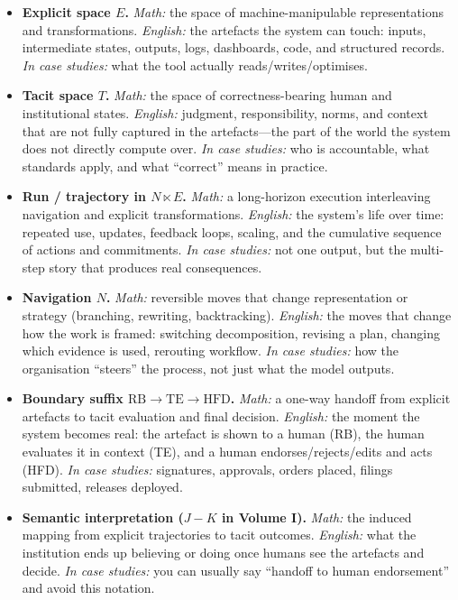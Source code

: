 \begin{itemize}
  \item \textbf{Explicit space $E$.}
        \emph{Math:} the space of machine-manipulable representations and transformations.
        \emph{English:} the artefacts the system can touch: inputs, intermediate states, outputs, logs,
        dashboards, code, and structured records.
        \emph{In case studies:} what the tool actually reads/writes/optimises.

  \item \textbf{Tacit space $T$.}
        \emph{Math:} the space of correctness-bearing human and institutional states.
        \emph{English:} judgment, responsibility, norms, and context that are not fully captured in the
        artefacts---the part of the world the system does not directly compute over.
        \emph{In case studies:} who is accountable, what standards apply, and what ``correct'' means in practice.

  \item \textbf{Run / trajectory in $N \ltimes E$.}
        \emph{Math:} a long-horizon execution interleaving navigation and explicit transformations.
        \emph{English:} the system’s life over time: repeated use, updates, feedback loops, scaling, and
        the cumulative sequence of actions and commitments.
        \emph{In case studies:} not one output, but the multi-step story that produces real consequences.

  \item \textbf{Navigation $N$.}
        \emph{Math:} reversible moves that change representation or strategy (branching, rewriting, backtracking).
        \emph{English:} the moves that change how the work is framed: switching decomposition, revising a plan,
        changing which evidence is used, rerouting workflow.
        \emph{In case studies:} how the organisation ``steers'' the process, not just what the model outputs.

  \item \textbf{Boundary suffix $\mathrm{RB}\to\mathrm{TE}\to\mathrm{HFD}$.}
        \emph{Math:} a one-way handoff from explicit artefacts to tacit evaluation and final decision.
        \emph{English:} the moment the system becomes real: the artefact is shown to a human (RB), the human
        evaluates it in context (TE), and a human endorses/rejects/edits and acts (HFD).
        \emph{In case studies:} signatures, approvals, orders placed, filings submitted, releases deployed.

  \item \textbf{Semantic interpretation ($J{-}K$ in Volume I).}
        \emph{Math:} the induced mapping from explicit trajectories to tacit outcomes.
        \emph{English:} what the institution ends up believing or doing once humans see the artefacts and decide.
        \emph{In case studies:} you can usually say ``handoff to human endorsement'' and avoid this notation.


\end{itemize}
